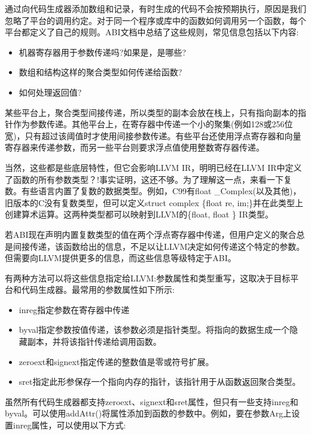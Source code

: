 通过向代码生成器添加数组和记录，有时生成的代码不会按预期执行，原因是我们忽略了平台的调用约定。对于同一个程序或库中的函数如何调用另一个函数，每个平台都定义了自己的规则。ABI文档中总结了这些规则，常见信息包括以下内容:

\begin{itemize}
\item
机器寄存器用于参数传递吗?如果是，是哪些?

\item
数组和结构这样的聚合类型如何传递给函数?

\item
如何处理返回值?
\end{itemize}

某些平台上，聚合类型间接传递，所以类型的副本会放在栈上，只有指向副本的指针作为参数传递。其他平台上，在寄存器中传递一个小的聚集(例如128或256位宽)，只有超过该阈值时才使用间接参数传递。有些平台还使用浮点寄存器和向量寄存器来传递参数，而另一些平台则要求浮点值使用整数寄存器传递。

当然，这些都是些底层特性，但它会影响LLVM IR，明明已经在LLVM IR中定义了函数的所有参数类型？!事实证明，这还不够。为了理解这一点，来看一下复数。有些语言内置了复数的数据类型。例如，C99有float \_Complex(以及其他)，旧版本的C没有复数类型，但可以定义struct complex \{float re, im;\}并在此类型上创建算术运算。这两种类型都可以映射到LLVM的\{float, float \} IR类型。

若ABI现在声明内置复数类型的值在两个浮点寄存器中传递，但用户定义的聚合总是间接传递，该函数给出的信息，不足以让LLVM决定如何传递这个特定的参数。但需要向LLVM提供更多的信息，而这些信息等级特定于ABI。

有两种方法可以将这些信息指定给LLVM:参数属性和类型重写，这取决于目标平台和代码生成器。最常用的参数属性如下所示:

\begin{itemize}
\item
inreg指定参数在寄存器中传递

\item
byval指定参数按值传递，该参数必须是指针类型。将指向的数据生成一个隐藏副本，并将该指针传递给调用函数。

\item
zeroext和signext指定传递的整数值是零或符号扩展。

\item
sret指定此形参保存一个指向内存的指针，该指针用于从函数返回聚合类型。
\end{itemize}

虽然所有代码生成器都支持zeroext、signext和sret属性，但只有一些支持inreg和byval。可以使用addAttr()将属性添加到函数的参数中。例如，要在参数Arg上设置inreg属性，可以使用以下方式:

